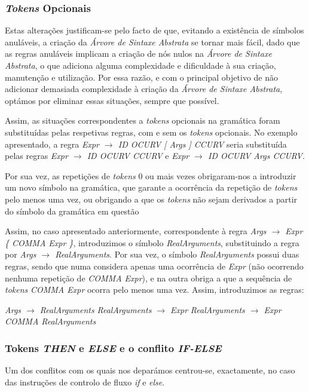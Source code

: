 \documentclass[11pt,a4paper]{article}
\begin{document}
\subsubsection{\emph{Tokens} Opcionais}

Estas alterações justificam-se pelo facto de que, evitando a existência de símbolos anuláveis, a criação da \emph{Árvore de Sintaxe Abstrata} se tornar mais fácil, dado que as regras anuláveis implicam a criação de nós nulos na \emph{Árvore de Sintaxe Abstrata}, o que adiciona alguma complexidade e dificuldade à sua criação, manutenção e utilização. Por essa razão, e com o principal objetivo de não adicionar demasiada complexidade à criação da \emph{Árvore de Sintaxe Abstrata}, optámos por eliminar essas situações, sempre que possível.

Assim, as situações correspondentes a \emph{tokens} opcionais na gramática foram substituídas pelas respetivas regras, com e sem os \emph{tokens} opcionais. No exemplo apresentado, a regra \emph{Expr $\rightarrow$ ID OCURV [ Args ] CCURV} seria substituída pelas regras \emph{Expr $\rightarrow$ ID OCURV CCURV} e \emph{Expr $\rightarrow$ ID OCURV Args CCURV}.

Por sua vez, as repetições de \emph{tokens} 0 ou mais vezes obrigaram-nos a introduzir um novo símbolo na gramática, que garante a ocorrência da repetição de \emph{tokens} pelo menos uma vez, ou obrigando a que os \emph{tokens} não sejam derivados a partir do símbolo da gramática em questão

Assim, no caso apresentado anteriormente, correspondente à regra \emph{Args $\rightarrow$ Expr \{ COMMA Expr \}}, introduzimos o símbolo \emph{RealArguments}, substituindo a regra por \emph{Args $\rightarrow$ RealArguments}. Por sua vez, o símbolo \emph{RealArguments} possui duas regras, sendo que numa considera apenas uma ocorrência de \emph{Expr} (não ocorrendo nenhuma repetição de \emph{COMMA Expr}), e na outra obriga a que a sequência de \emph{tokens} \emph{COMMA Expr} ocorra pelo menos uma vez. Assim, introduzimos as regras:

\emph{Args $\rightarrow$ RealArguments}
\emph{RealArguments $\rightarrow$ Expr}
\emph{RealArguments $\rightarrow$ Expr COMMA RealArguments}

\subsubsection{Tokens \emph{THEN} e \emph{ELSE} e o conflito \emph{IF-ELSE}}

Um dos conflitos com os quais nos deparámos centrou-se, exactamente, no caso das instruções de controlo de fluxo \emph{if} e \emph{else}.
\end{document}
